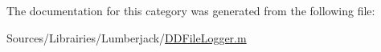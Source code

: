 The documentation for this category was generated from the following file\-:\begin{DoxyCompactItemize}
\item 
Sources/\-Librairies/\-Lumberjack/\hyperlink{_d_d_file_logger_8m}{D\-D\-File\-Logger.\-m}\end{DoxyCompactItemize}
